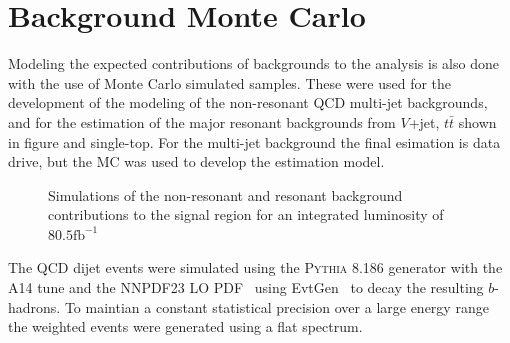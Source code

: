 \section{Background Monte Carlo} \label{sec:data:bkg_mc}

Modeling the expected contributions of backgrounds to the analysis is also done
with the use of Monte Carlo simulated samples.  These were used for the
development of the modeling of the non-resonant QCD multi-jet backgrounds, and
for the estimation of the major resonant backgrounds from $V$+jet, $t\bar{t}$
shown in figure  and single-top.  For the
multi-jet background the final esimation is data drive, but the MC was used to
develop the estimation model.

\begin{figure}[!htbp]
  \centering
   \hfill
  \caption{Simulations of the non-resonant and resonant background contributions to the signal region for an integrated luminosity of $80.5\text{fb}^{-1}$}
  \label{simulated_background_shapes}
\end{figure}

The QCD dijet events were simulated using the \textsc{Pythia} 8.186
\cite{Sjostrand:2007gs} generator with the A14 tune and the NNPDF23 LO
PDF~\cite{Carrazza:2013axa} using EvtGen~\cite{LANGE2001152} to decay
the resulting $b$-hadrons.  To maintian a constant statistical precision over
a large energy range the weighted events were generated using a flat \pT
spectrum.

